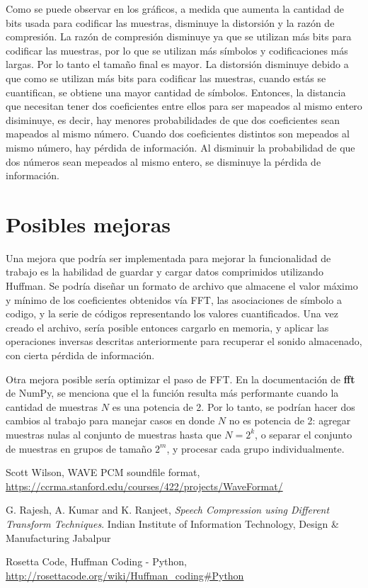 \documentclass[12pt,a4paper]{article}
\begin{document}
Como se puede observar en los gráficos, a medida que aumenta la cantidad de bits usada para codificar las muestras, disminuye la distorsión y la razón de compresión. La razón de compresión disminuye ya que se utilizan más bits para codificar las muestras, por lo que se utilizan más símbolos y codificaciones más largas. Por lo tanto el tamaño final es mayor. La distorsión disminuye debido a que como se utilizan más bits para codificar las muestras, cuando estás se cuantifican, se obtiene una mayor cantidad de símbolos. Entonces, la distancia que necesitan tener dos coeficientes entre ellos para ser mapeados al mismo entero disiminuye, es decir, hay menores probabilidades de que dos coeficientes sean mapeados al mismo número. Cuando dos coeficientes distintos son mepeados al mismo número, hay pérdida de información. Al disminuir la probabilidad de que dos números sean mepeados al mismo entero, se disminuye la pérdida de información.

\section{Posibles mejoras}

Una mejora que podría ser implementada para mejorar la funcionalidad de trabajo es la habilidad de guardar y cargar datos comprimidos utilizando Huffman.  Se podría diseñar un formato de archivo que almacene el valor máximo y mínimo de los coeficientes obtenidos vía FFT, las asociaciones de símbolo a codigo, y la serie de códigos representando los valores cuantificados.  Una vez creado el archivo, sería posible entonces cargarlo en memoria, y aplicar las operaciones inversas descritas anteriormente para recuperar el sonido almacenado, con cierta pérdida de información.

Otra mejora posible sería optimizar el paso de FFT.  En la documentación de \textbf{fft} de NumPy, se menciona que el la función resulta más performante cuando la cantidad de muestras $N$ es una potencia de 2.  Por lo tanto, se podrían hacer dos cambios al trabajo para manejar casos en donde $N$ no es potencia de 2: agregar muestras nulas al conjunto de muestras hasta que $N = 2^k$, o separar el conjunto de muestras en grupos de tamaño $2^m$, y procesar cada grupo individualmente.


\clearpage

\renewcommand\refname{Referencias}
\begin{thebibliography}{9}

  Scott Wilson,
  WAVE PCM soundfile format,
  \url{https://ccrma.stanford.edu/courses/422/projects/WaveFormat/}

  G. Rajesh, A. Kumar and K. Ranjeet,
  \emph{Speech Compression using Different Transform Techniques}.
  Indian Institute of Information Technology, Design \& Manufacturing Jabalpur

  Rosetta Code,
  Huffman Coding - Python,
  \url{http://rosettacode.org/wiki/Huffman_coding#Python}

\end{thebibliography}
\end{document}
